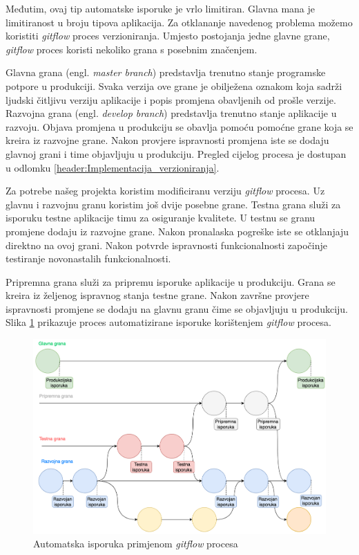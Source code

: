 \documentclass[times, utf8, diplomski, numeric]{fer}
\newcommand{\eng}[1]{(engl. \textit{#1})}
\begin{document}
Međutim, ovaj tip automatske isporuke je vrlo limitiran. Glavna mana je limitiranost u broju tipova aplikacija. Za otklananje navedenog problema možemo koristiti \textit{gitflow} proces verzioniranja. Umjesto postojanja jedne glavne grane, \textit{gitflow} proces koristi nekoliko grana s posebnim značenjem.

Glavna grana \eng{master branch} predstavlja trenutno stanje programske potpore u produkciji. Svaka verzija ove grane je obilježena oznakom koja sadrži ljudski čitljivu verziju aplikacije i popis promjena obavljenih od prošle verzije. Razvojna grana \eng{develop branch} predstavlja trenutno stanje aplikacije u razvoju. Objava promjena u produkciju se obavlja pomoću pomoćne grane koja se kreira iz razvojne grane. Nakon provjere ispravnosti promjena iste se dodaju glavnoj grani i time objavljuju u produkciju. Pregled cijelog procesa je dostupan u odlomku \ref{header:Implementacija_verzioniranja}.

Za potrebe našeg projekta koristim modificiranu verziju \textit{gitflow} procesa. Uz glavnu i razvojnu granu koristim još dvije posebne grane. Testna grana služi za isporuku testne aplikacije timu za osiguranje kvalitete. U testnu se granu promjene dodaju iz razvojne grane. Nakon pronalaska pogreške iste se otklanjaju direktno na ovoj grani. Nakon potvrde ispravnosti funkcionalnosti započinje testiranje novonastalih funkcionalnosti.

Pripremna grana služi za pripremu isporuke aplikacije u produkciju. Grana se kreira iz željenog ispravnog stanja testne grane. Nakon završne provjere ispravnosti promjene se dodaju na glavnu granu čime se objavljuju u produkciju. Slika \ref{fig:GitFlowCD} prikazuje proces automatizirane isporuke korištenjem \textit{gitflow} procesa.

\begin{figure}
\centering
\includegraphics[scale=0.5]{GitFlowCD}
\caption{Automatska isporuka primjenom \textit{gitflow} procesa}
\label{fig:GitFlowCD}
\end{figure}
\end{document}
